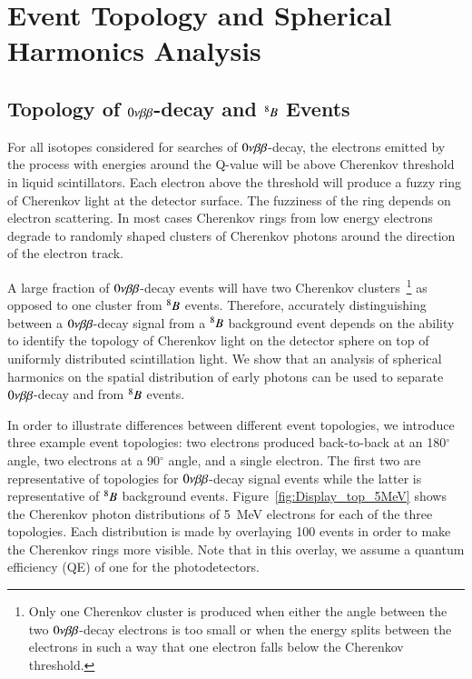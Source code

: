 \section{Event Topology and Spherical Harmonics Analysis}
\label{sec:topology_and_harmonics}

\subsection{Topology of $0\nu\beta\beta$-decay and $^{8}B$ Events}
\label{subsec:topology}

For all isotopes considered for searches of $0\nu\beta\beta$-decay, the electrons emitted by the process with energies around the Q-value will be above Cherenkov threshold in liquid scintillators.  Each electron above the threshold will produce a fuzzy ring of Cherenkov light at the detector surface. The fuzziness of the ring depends on electron scattering. In most cases Cherenkov rings from low energy electrons degrade to randomly shaped clusters of Cherenkov photons around the direction of the electron track. 

A large fraction of $0\nu\beta\beta$-decay events will have two Cherenkov clusters~\footnote{Only one Cherenkov cluster is produced when either the angle between the two $0\nu\beta\beta$-decay electrons is too small or when the energy splits between the electrons in such a way that one electron falls below the Cherenkov threshold.} as opposed to one cluster from $^{8}B$ events. Therefore, accurately distinguishing between a $0\nu\beta\beta$-decay signal from a $^{8}B$ background event depends on the ability to identify the topology of Cherenkov light on the detector sphere on top of uniformly distributed scintillation light. We show that an analysis of spherical harmonics on the spatial distribution of early photons can be used to separate $0\nu\beta\beta$-decay and from $^{8}B$ events.


In order to illustrate differences between different event topologies, we introduce three example event topologies: two electrons produced back-to-back at an 180$^{\circ}$ angle, two electrons at a 90$^{\circ}$ angle, and a single electron. The first two are representative of topologies for $0\nu\beta\beta$-decay signal events while the latter is representative of $^{8}B$ background events. Figure~\ref{fig:Display_top_5MeV} shows the Cherenkov photon distributions of 5~MeV electrons for each of the three topologies. Each distribution is made by overlaying 100 events in order to make the Cherenkov rings more visible. Note that in this overlay, we assume a quantum efficiency (QE) of one for the photodetectors.

